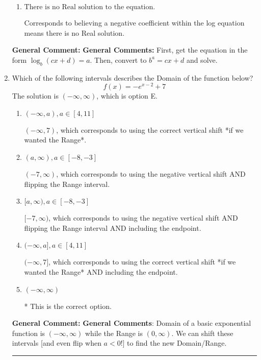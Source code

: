 \documentclass{extbook}[14pt]
\newcommand{\litem}[1]{\item #1

\rule{\textwidth}{0.4pt}}
\begin{document}
\begin{enumerate}
{\begin{enumerate}[label=\Alph*.]
$x = -9.500$, which corresponds to reversing the base and exponent when converting.
\item \( \text{There is no Real solution to the equation.} \)

Corresponds to believing a negative coefficient within the log equation means there is no Real solution.
\end{enumerate}

\textbf{General Comment:} \textbf{General Comments:} First, get the equation in the form $\log_b{(cx+d)} = a$. Then, convert to $b^a = cx+d$ and solve.
}
\litem{
Which of the following intervals describes the Domain of the function below?
\[ f(x) = -e^{x-2}+7 \]The solution is \( (-\infty, \infty) \), which is option E.\begin{enumerate}[label=\Alph*.]
\item \( (-\infty, a), a \in [4, 11] \)

$(-\infty, 7)$, which corresponds to using the correct vertical shift *if we wanted the Range*.
\item \( (a, \infty), a \in [-8, -3] \)

$(-7, \infty)$, which corresponds to using the negative vertical shift AND flipping the Range interval.
\item \( [a, \infty), a \in [-8, -3] \)

$[-7, \infty)$, which corresponds to using the negative vertical shift AND flipping the Range interval AND including the endpoint.
\item \( (-\infty, a], a \in [4, 11] \)

$(-\infty, 7]$, which corresponds to using the correct vertical shift *if we wanted the Range* AND including the endpoint.
\item \( (-\infty, \infty) \)

* This is the correct option.
\end{enumerate}

\textbf{General Comment:} \textbf{General Comments}: Domain of a basic exponential function is $(-\infty, \infty)$ while the Range is $(0, \infty)$. We can shift these intervals [and even flip when $a<0$!] to find the new Domain/Range.
}
\end{enumerate}
\end{document}
